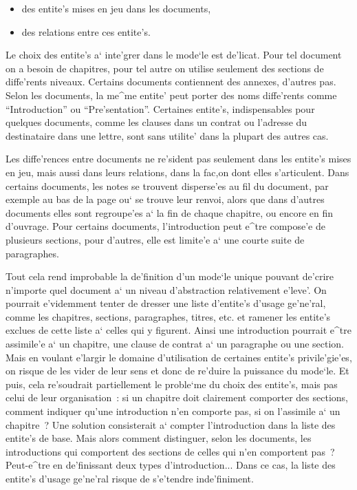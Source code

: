 \begin{itemize}
\item
des entite's mises en jeu dans les documents,
\item
des relations entre ces entite's.
\end{itemize}

Le choix des entite's a` inte'grer dans le mode`le est de'licat. Pour tel
document on a besoin de chapitres, pour tel autre on utilise seulement des
sections de diffe'rents niveaux. Certains documents contiennent des annexes,
d'autres pas. Selon les documents, la me^me entite' peut porter des noms
diffe'rents comme ``Introduction'' ou ``Pre'sentation''. Certaines entite's,
indispensables pour quelques documents, comme les clauses dans un contrat
ou l'adresse du destinataire dans une lettre, sont sans utilite' dans
la plupart des autres cas.

Les diffe'rences entre documents ne re'sident pas seulement dans les entite's
mises en jeu, mais aussi dans leurs relations, dans la fac,on dont elles
s'articulent. Dans certains documents, les notes se trouvent disperse'es au
fil du document, par exemple au bas de la page ou` se trouve leur renvoi,
alors que dans d'autres documents elles sont regroupe'es a` la fin de
chaque chapitre, ou encore en fin d'ouvrage. Pour certains documents,
l'introduction peut e^tre compose'e de plusieurs sections, pour d'autres,
elle est limite'e a` une courte suite de paragraphes.

Tout cela rend improbable la de'finition d'un mode`le unique pouvant de'crire
n'importe quel document a` un niveau d'abstraction relativement e'leve'.
On pourrait e'videmment tenter de dresser une liste d'entite's d'usage
ge'ne'ral, comme les chapitres, sections, paragraphes, titres, etc.
et ramener les entite's exclues de cette liste a` celles qui y figurent.
Ainsi une introduction pourrait e^tre assimile'e a` un chapitre, une clause de
contrat a` un paragraphe ou une section. Mais en voulant e'largir le domaine
d'utilisation de certaines entite's privile'gie'es, on risque de les vider de
leur sens et donc de re'duire la puissance du mode`le. Et puis,
cela re'soudrait partiellement
le proble`me du choix des entite's, mais pas celui de leur organisation~: si
un chapitre doit clairement comporter des sections, comment indiquer qu'une
introduction n'en comporte pas, si on l'assimile a` un
chapitre~? Une solution consisterait a` compter l'introduction dans la liste
des entite's de base. Mais alors comment distinguer, selon les documents,
les introductions qui comportent des sections de celles qui n'en comportent
pas~? Peut-e^tre en de'finissant deux types d'introduction...
Dans ce cas, la liste des entite's d'usage ge'ne'ral risque de s'e'tendre
inde'finiment.

